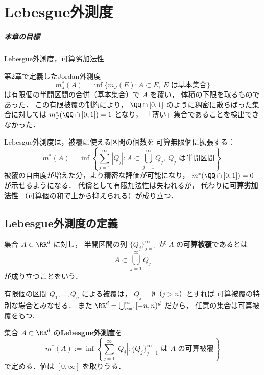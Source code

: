 \setcounter{chapter}{2}
\chapter{Lebesgue外測度}\label{chap:lebesgue-outer}

\paragraph{本章の目標}
Lebesgue外測度，可算劣加法性

第2章で定義したJordan外測度
\[
m_J^*(A) = \inf\{m_J(E) : A \subset E,\ E \text{ は基本集合}\}
\]
は有限個の半開区間の合併（基本集合）で $A$ を覆い，
体積の下限を取るものであった．
この有限被覆の制約により，
$\QQ \cap [0,1]$ のように稠密に散らばった集合に対しては
$m_J^*(\QQ \cap [0,1]) = 1$ となり，
「薄い」集合であることを検出できなかった．

Lebesgue外測度は，被覆に使える区間の個数を
可算無限個に拡張する：
\[
m^*(A)
= \inf\!\left\{
\sum_{j=1}^{\infty} |Q_j|
: A \subset \bigcup_{j=1}^{\infty} Q_j,\
Q_j \text{ は半開区間}
\right\}.
\]
被覆の自由度が増えた分，より精密な評価が可能になり，
$m^*(\QQ \cap [0,1]) = 0$ が示せるようになる．
代償として有限加法性は失われるが，
代わりに\textbf{可算劣加法性}
（可算個の和で上から抑えられる）が成り立つ．

\section{Lebesgue外測度の定義}\label{sec:lebesgue-outer-def}

\begin{definition}[可算被覆]\label{def:countable-cover}
集合 $A \subset \RR^d$ に対し，
半開区間の列 $\{Q_j\}_{j=1}^{\infty}$ が
$A$ の\textbf{可算被覆}であるとは
\[
A \subset \bigcup_{j=1}^{\infty} Q_j
\]
が成り立つことをいう．
\end{definition}

\begin{remark}
有限個の区間 $Q_1,\ldots,Q_n$ による被覆は，
$Q_j = \emptyset$（$j > n$）とすれば
可算被覆の特別な場合とみなせる．
また $\RR^d = \bigcup_{n=1}^{\infty} [-n,n)^d$ だから，
任意の集合は可算被覆をもつ．
\end{remark}

\begin{definition}[Lebesgue外測度]\label{def:lebesgue-outer-measure}
集合 $A \subset \RR^d$ の\textbf{Lebesgue外測度}を
\[
m^*(A)
:= \inf\!\left\{
\sum_{j=1}^{\infty} |Q_j|
: \{Q_j\}_{j=1}^{\infty} \text{ は } A \text{ の可算被覆}
\right\}
\]
で定める．値は $[0,\infty]$ を取りうる．
\end{definition}

